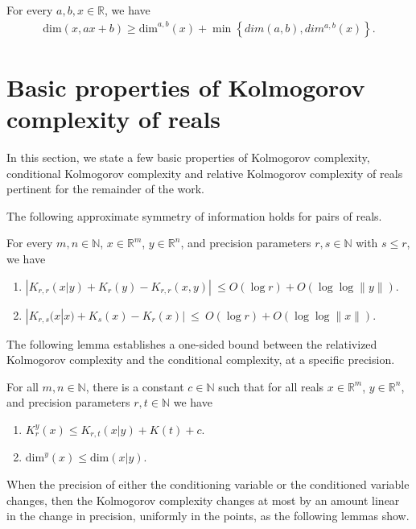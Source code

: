 \documentclass[a4paper,UKenglish,cleveref,autoref,thm-restate]{lipics-v2021}
\newcommand{\N}{\mathbb{N}}
\newcommand{\R}{\mathbb{R}}
\renewcommand{\dim}{{\mathrm{dim}}}
\begin{document}
\begin{theorem} 
For every $a,b,x\in\mathbb{R}$, we have
\begin{align}\label{thm:line_dim_ub}
\dim\left(x,ax+b\right)\geq\dim^{a,b}\left(x\right)+\min\left\{dim(a,b),dim^{a,b}(x)\right\}.
\end{align}
\end{theorem}


\section{Basic properties of Kolmogorov complexity of reals}
In this section, we state a few basic properties of Kolmogorov complexity, conditional Kolmogorov complexity and relative Kolmogorov complexity of reals pertinent for the remainder of the work.

The following approximate symmetry of information holds for pairs of reals. 

\begin{lemma}
\label{lem:soi}
For every $m,n\in\N$, $x\in\R^m$, $y\in\R^n$, and precision parameters
$r,s\in\N$ with $s\le r$, we have
\begin{enumerate}
\item $\left|K_{r,r}(x|y)+K_r(y)-K_{r,r}(x,y)\right|~\le 
O(\log r)+O(\log\log\|y\|)$.
\item $|K_{r,s}(x|x)+K_s(x)-K_r(x)|~\le ~
O(\log r)+O(\log\log\|x\|)$.
\end{enumerate}
\end{lemma}
The following lemma establishes a one-sided bound between the
relativized Kolmogorov complexity and the conditional complexity, at a
specific precision.

\begin{lemma}
\label{lem:relative_conditional_complexity}
For all $m,n\in\N$, there is a constant $c\in\N$ such that for all
reals $x\in\R^m$, $y\in\R^n$, and precision parameters $r,t\in\N$ we
have
\begin{enumerate}
\item $K_r^y(x)\le K_{r,t}(x|y)+K(t)+c$.
\item $\dim^y(x)\le\dim(x|y)$.
\end{enumerate}
\end{lemma}
When the precision of either the conditioning variable or the
conditioned variable changes, then the Kolmogorov complexity changes
at most by an amount linear in the change in precision, uniformly in
the points, as the following lemmas show.
\end{document}
